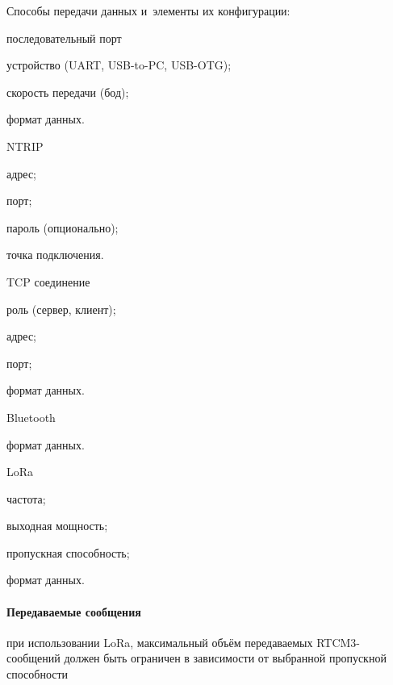Способы передачи данных и~элементы их конфигурации:
\begin{dashitemize}
  \item последовательный порт
  \begin{dashitemize}
    \item устройство (UART, USB-to-PC, USB-OTG);
    \item скорость передачи (бод);
    \item формат данных.
  \end{dashitemize}

  \item NTRIP
  \begin{dashitemize}
    \item адрес;
    \item порт;
    \item пароль (опционально);
    \item точка подключения.
  \end{dashitemize}

  \item TCP соединение
  \begin{dashitemize}
    \item роль (сервер, клиент);
    \item адрес;
    \item порт;
    \item формат данных.
  \end{dashitemize}

  \item Bluetooth
  \begin{dashitemize}
    \item формат данных.
  \end{dashitemize}

  \item LoRa
  \begin{dashitemize}
    \item частота;
    \item выходная мощность;
    \item пропускная способность;
    \item формат данных.
  \end{dashitemize}
\end{dashitemize}

\paragraph{Передаваемые сообщения}

при использовании LoRa, максимальный объём передаваемых RTCM3-сообщений должен быть ограничен в зависимости от выбранной пропускной способности

